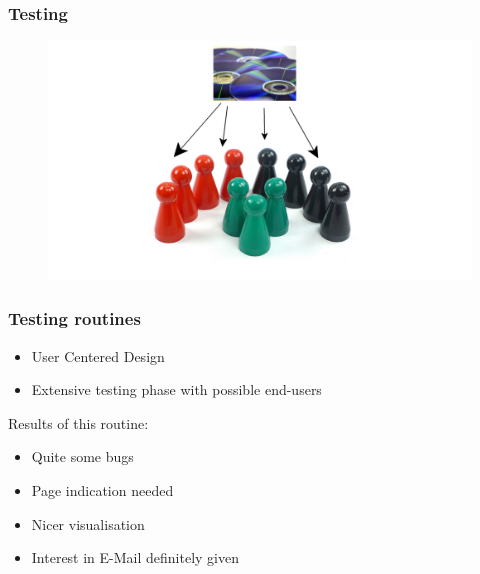 \documentclass[9pt]{beamer}
\begin{document}
		\begin{frame}
			\frametitle{Testing}
			\begin{figure}
				\centering
				\includegraphics[scale=0.5]{Images/test_distribution.png}
			\end{figure}
		\end{frame}
		
		\begin{frame}
			\frametitle{Testing routines}
			\begin{itemize}
				\item User Centered Design
				\item Extensive testing phase with possible end-users
			\end{itemize}
			Results of this routine:
			\begin{itemize}
				\item Quite some bugs
				\item Page indication needed
				\item Nicer visualisation
				\item Interest in E-Mail definitely given
			\end{itemize}
		\end{frame}
			
		
			
\end{document}
